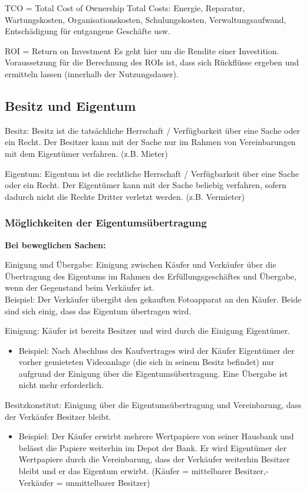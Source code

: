 \documentclass[asp1.tex]{subfiles}
\begin{document}
TCO = Total Cost of Ownership
Total Costs: Energie, Reparatur, Wartungskosten, Organisationskosten, Schulungskosten, Verwaltungsaufwand, Entschädigung für entgangene Geschäfte usw.

ROI = Return on Investment
Es geht hier um die Rendite einer Investition. Voraussetzung für die Berechnung des ROIs ist, dass sich Rückflüsse ergeben und ermitteln lassen (innerhalb der Nutzungsdauer).

\subsection{Besitz und Eigentum}
Besitz: Besitz ist die tatsächliche Herrschaft / Verfügbarkeit über eine Sache oder ein Recht. Der Besitzer kann mit der Sache nur im Rahmen von Vereinbarungen mit dem Eigentümer verfahren. (z.B. Mieter)

Eigentum: Eigentum ist die rechtliche Herrschaft / Verfügbarkeit über eine Sache oder ein Recht. Der Eigentümer kann mit der Sache beliebig verfahren, sofern dadurch nicht die Rechte Dritter verletzt werden. (z.B. Vermieter)

\subsubsection{Möglichkeiten der Eigentumsübertragung}
\textbf{Bei beweglichen Sachen:}

Einigung und Übergabe:
Einigung zwischen Käufer und Verkäufer über die Übertragung des Eigentums im Rahmen des Erfüllungsgeschäftes und Übergabe, wenn der Gegenstand beim Verkäufer ist.\\
Beispiel: Der Verkäufer übergibt den gekauften Fotoapparat an den Käufer. Beide sind sich einig, dass das Eigentum übertragen wird.


Einigung: Käufer ist bereits Besitzer und wird durch die Einigung Eigentümer.
\begin{itemize}
    \item Beispiel: Nach Abschluss des Kaufvertrages wird der Käufer Eigentümer der vorher gemieteten Videoanlage (die sich in seinem Besitz befindet) nur aufgrund der Einigung über die Eigentumsübertragung. Eine Übergabe ist nicht mehr erforderlich.
\end{itemize}


Besitzkonstitut:
Einigung über die Eigentumsübertragung und Vereinbarung, dass der Verkäufer Besitzer bleibt.
\begin{itemize}
    \item Beispiel: Der Käufer erwirbt mehrere Wertpapiere von seiner Hausbank und belässt die Papiere weiterhin im Depot der Bank. Er wird Eigentümer der Wertpapiere durch die Vereinbarung, dass der Verkäufer weiterhin Besitzer bleibt und er das Eigentum erwirbt. (Käufer = mittelbarer Besitzer,- Verkäufer = unmittelbarer Besitzer)
\end{itemize}
\end{document}
